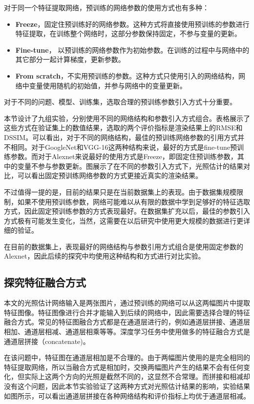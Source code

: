 对于同一个特征提取网络，预训练的网络参数的使用方式也有多种：
\begin{itemize}
    \item \textbf{Freeze}，固定住预训练好的网络参数。这种方式将直接使用预训练的参数进行特征提取，在训练整个网络时，这部分参数保持固定，不参与变量的更新。
    \item \textbf{Fine-tune}， 以预训练的网络参数作为初始参数。在训练的过程中与网络中的其它部分一起计算梯度，更新参数。
    \item \textbf{From scratch}，不实用预训练的参数。这种方式只使用引入的网络结构，网络中变量使用随机的初始值，并参与网络中的变量更新。
\end{itemize}
对于不同的问题、模型、训练集，选取合理的预训练参数引入方式十分重要。

本节设计了九组实验，分别使用不同的网络结构和参数引入方式组合。表格展示了这些方式在验证集上的数值结果，选取的两个评价指标是渲染结果上的RMSE和DSSIM。可以看出，对于不同的网络结构，最佳的预训练网络参数的引用方式并不相同。对于GoogleNet和VGG-16这两种结构来说，最好的方式是fine-tune预训练参数。而对于Alexnet来说最好的使用方式是Freeze，即固定住预训练参数，其中的变量不参与参数更新。图展示了在不同的参数引入方式下，光照估计的结果对比，可以看出固定预训练网络参数的方式更接近真实的渲染结果。

不过值得一提的是，目前的结果只是在当前数据集上的表现。由于数据集规模限制，如果不使用预训练参数，网络可能难以从有限的数据中学到足够好的特征选取方式，因此固定预训练参数的方式表现最好。在数据集扩充以后，最佳的参数引入方式极有可能发生变化，当然，这需要在以后研究中使用更大规模的数据进行更详细的验证。

在目前的数据集上，表现最好的网络结构与参数引用方式组合是使用固定参数的Alexnet，因此后续的探究中均使用这种结构和方式进行对比实验。
\subsection{探究特征融合方式}
本文的光照估计网络输入是两张图片，通过预训练的网络可以从这两幅图片中提取特征图像。特征图像进行合并才能输入到后续的网络中，因此需要选择合理的特征融合方式。常见的特征图融合方式都是在通道层进行的，例如通道层拼接、通道层相加、通道层相减、通道层相乘等等。深度学习任务中使用做多的特征融合方式是通道层拼接（concatenate)。

在该问题中，特征图在通道层相加是不合理的。由于两幅图片使用的是完全相同的特征提取网络，所以当融合方式是相加时，交换两幅图片产生的结果不会有任何变化，但实际上这两个方向的光照是截然不同的，这显然不合常理。而拼接和相减却没有这个问题，因此本节实验验证了这两种方式对光照估计结果的影响，实验结果如图所示，可以看出通道层拼接在各种网络结构和评价指标上均优于通道层相减。
